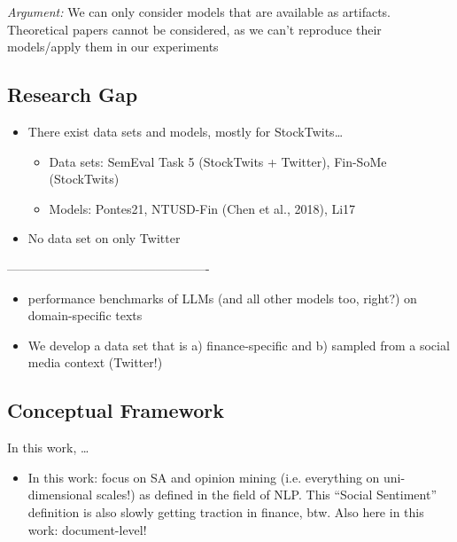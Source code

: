 \emph{Argument:} We can only consider models that are available as artifacts. Theoretical papers cannot be considered, as we can't reproduce their models/apply them in our experiments










\subsection{Research Gap}
\begin{itemize}[noitemsep]
	\item There exist data sets and models, mostly for StockTwits\dots
	\begin{itemize}[noitemsep]
		\item Data sets: SemEval Task 5 (StockTwits + Twitter), Fin-SoMe (StockTwits)
		\item Models: Pontes21, NTUSD-Fin (Chen et al., 2018), Li17
	\end{itemize}
	\item No data set on only Twitter
\end{itemize}
-------------------------------------------------
\begin{itemize}[noitemsep]
	\item performance benchmarks of LLMs (and all other models too, right?) on domain-specific texts
	\item We develop a data set that is a) finance-specific and b) sampled from a social media context (Twitter!) 	
\end{itemize}







\subsection{Conceptual Framework}

In this work, \dots 

\begin{itemize}[noitemsep]
	\item In this work: focus on SA and opinion mining (i.e. everything on uni-dimensional scales!) as defined in the field of NLP. This ``Social Sentiment'' definition is also slowly getting traction in finance, btw. Also here in this work: document-level!
\end{itemize}



